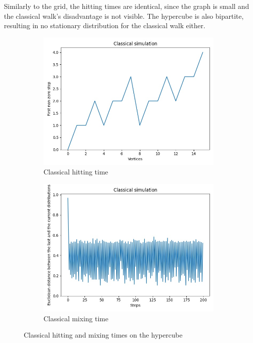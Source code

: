 Similarly to the grid, the hitting times are identical, since the graph is small and the classical walk's
disadvantage is not visible. The hypercube is also bipartite, resulting in no stationary distribution for the
classical walk either.

\begin{figure}[H]
  \centering
  \begin{subfigure}{.45\linewidth}
    \centering
    \includegraphics[width=\linewidth]{./figures/results/hypercube/classical_hitting_time.jpg}
    \caption{Classical hitting time}
  \end{subfigure}
  \begin{subfigure}{.45\linewidth}
    \centering
    \includegraphics[width=\linewidth]{./figures/results/hypercube/classical_mixing_time.jpg}
    \caption{Classical mixing time}
  \end{subfigure}
  \caption{Classical hitting and mixing times on the hypercube}
\end{figure}

